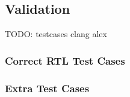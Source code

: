 \subsection{Validation}

TODO: testcases clang alex

\subsubsection{Correct RTL Test Cases}

%

\subsubsection{Extra Test Cases}

%
%
